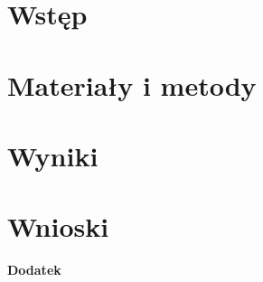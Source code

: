 \documentclass[12pt, a4paper]{article}
\begin{document}

\newpage
\thispagestyle{empty}


\newpage
\setcounter{page}{3}
\thispagestyle{empty}
\tableofcontents
\vspace{\fill}
\printglossary[type=\acronymtype, title={Wykaz skrótów}]

\newpage
\thispagestyle{empty}
\vspace*{\fill}

\vspace*{\fill}

\newpage
\section{Wstęp}\label{sec:wstep}


\section{Materiały i metody}\label{sec:metody}


\section{Wyniki}\label{sec:wyniki}


\section{Wnioski}\label{sec:wnioski}





\newpage

\Large\textbf{Dodatek}\label{dodatek}

\end{document}
